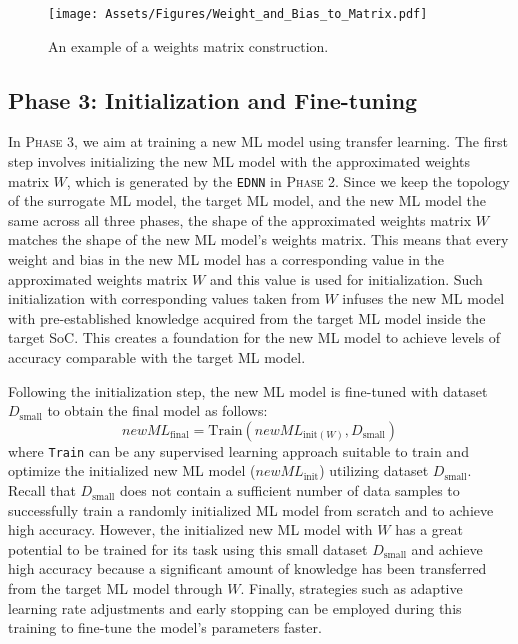 \documentclass[letterpaper]{article}
\begin{document}
 \begin{figure}[!t] \centerline{\texttt{[image: Assets/Figures/Weight\_and\_Bias\_to\_Matrix.pdf]}}
  \caption{An example of a weights matrix construction.}
\label{fig:Weight_and_Bias_to_Matrix}
\end{figure}

\subsection{Phase 3: Initialization and Fine-tuning}

In \textsc{Phase 3}, we aim at training a new ML model using transfer learning. The first step involves initializing the new ML model with the approximated weights matrix $W$, which is generated by the \texttt{EDNN} in \textsc{Phase 2}. Since we keep the topology of the surrogate ML model, the target ML model, and the new ML model the same across all three phases, the shape of the approximated weights matrix $W$ matches the shape of the new ML model's weights matrix. This means that every weight and bias in the new ML model has a corresponding value in the approximated weights matrix $W$ and this value is used for initialization. Such initialization with corresponding values taken from $W$ infuses the new ML model with pre-established knowledge acquired from the target ML model inside the target SoC. This creates a foundation for the new ML model to achieve levels of accuracy comparable with the target ML model.

Following the initialization step, the new ML model is fine-tuned with dataset $D_{\text{small}}$ to obtain the final model as follows:
\begin{equation}
newML_{\text{final}} = \text{Train}(newML_{\text{init}(W)}, D_{\text{small}})
\end{equation}
where \texttt{Train} can be any supervised learning approach suitable to train and optimize the initialized new ML model ($newML_{\text{init}}$) utilizing dataset $D_{\text{small}}$. 
Recall that  $D_{\text{small}}$ does not contain a sufficient number of data samples to successfully train a randomly initialized ML model from scratch and to achieve high accuracy. However, the initialized new ML model with $W$ has a great potential to be trained for its task using this small dataset $D_{\text{small}}$ and achieve high accuracy because a significant amount of knowledge has been transferred from the target ML model through $W$. Finally, strategies such as adaptive learning rate adjustments and early stopping can be employed during this training to fine-tune the model’s parameters faster.
\end{document}
